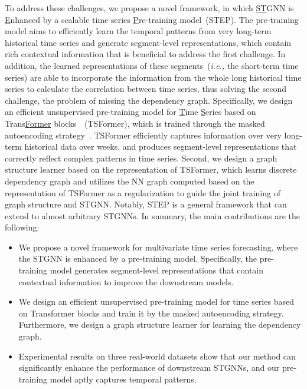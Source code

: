 \documentclass[sigconf]{acmart}
\newcommand{\ie}{\textit{i.e.,}\xspace}
\begin{document}
To address these challenges, we propose a novel framework, in which \underline{S}\underline{T}GNN is \underline{E}nhanced by a scalable time series \underline{P}re-training model~(STEP).
The pre-training model aims to efficiently learn the temporal patterns from very long-term historical time series and generate segment-level representations, which contain rich contextual information that is beneficial to address the first challenge.
In addition, the learned representations of these segments~(\ie the short-term time series) are able to incorporate the information from the whole long historical time series to calculate the correlation between time series, thus solving the second challenge, the problem of missing the dependency graph.
Specifically, we design an efficient unsupervised pre-training model for \underline{T}ime \underline{S}eries based on Trans\underline{Former} blocks~\cite{2017Transformer}~(TSFormer), which is trained through the masked autoencoding strategy~\cite{2021MAE}.
TSFormer efficiently captures information over very long-term historical data over weeks, and produces segment-level representations that correctly reflect complex patterns in time series.
Second, we design a graph structure learner based on the representation of TSFormer, which learns discrete dependency graph and utilizes the NN graph computed based on the representation of TSFormer as a regularization to guide the joint training of graph structure and STGNN.
Notably, STEP is a general framework that can extend to almost arbitrary STGNNs.
In summary, the main contributions are the following:
\begin{itemize}
    \item We propose a novel framework for multivariate time series forecasting, where the STGNN is enhanced by a pre-training model.
    Specifically, the pre-training model generates segment-level representations that contain contextual information to improve the downstream models.
    \item We design an efficient unsupervised pre-training model for time series based on Transformer blocks and train it by the masked autoencoding strategy. 
Furthermore, we design a graph structure learner for learning the dependency graph.
    \item Experimental results on three real-world datasets show that our method can significantly enhance the performance of downstream STGNNs, and our pre-training model aptly captures temporal patterns.
\end{itemize}
\end{document}
